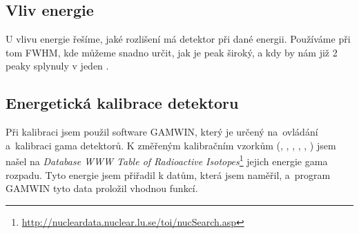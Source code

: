\documentclass[12pt,a4paper]{article}
\begin{document}
\begin{spacing}{1.5}
\subsection{Vliv energie}
U vlivu energie řešíme, jaké rozlišení má detektor při dané energii. Používáme při tom FWHM, kde můžeme snadno určit, jak je peak široký, a kdy by nám již 2 peaky splynuly v jeden \cite{stellarnet-fwhm, VUT}.\\ %
 \cite{Knoll2010} %

\subsection{Energetická kalibrace detektoru}
Při kalibraci jsem použil software GAMWIN, který je určený na~ovládání a~kalibraci gama detektorů. K změřeným kalibračním vzorkům (, , , , , ) jsem našel na \textit{Database WWW Table of Radioactive Isotopes}\footnote{\url{http://nucleardata.nuclear.lu.se/toi/nucSearch.asp}}
jejich energie gama rozpadu. Tyto energie jsem přiřadil k datům, která jsem naměřil, a~program GAMWIN tyto data proložil vhodnou funkcí. \cite{VUT,gamwin} 

\end{spacing}
\end{document}
